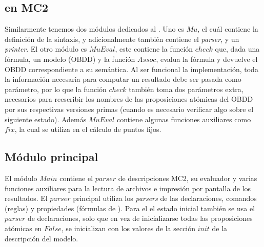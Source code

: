 \subsection{{\mucalculo} en MC2}

Similarmente tenemos dos módulos dedicados al {\mucalculo}. Uno es $Mu$, el cuál contiene la definición de la sintaxis, y adicionalmente también contiene el \textit{parser}, y un \textit{printer}. El otro módulo es $MuEval$, este contiene la función $check$ que, dada una fórmula, un modelo (OBDD) y la función $Assoc$, evalua la fórmula y devuelve el OBDD correspondiente a su semántica. Al ser funcional la implementación, toda la información necesaria para computar un resultado debe ser pasada como parámetro, por lo que la función $check$ también toma dos parámetros extra, necesarios para reescribir los nombres de las proposiciones atómicas del OBDD por sus respectivas versiones primas (cuando es necesario verificar algo sobre el siguiente estado). Además $MuEval$ contiene algunas funciones auxiliares como $fix$, la cual se utiliza en el cálculo de puntos fijos.

\subsection{Módulo principal}

El módulo $Main$ contiene el $parser$ de descripciones MC2, su evaluador y varias funciones auxiliares para la lectura de archivos e impresión por pantalla de los resultados. El $parser$ principal utiliza los \textit{parsers} de las declaraciones, comandos (reglas) y propiedades (fórmulas de {\mucalculo}). Para el el estado inicial también se usa el $parser$ de declaraciones, solo que en vez de inicializarse todas las proposiciones atómicas en $False$, se inicializan con los valores de la sección $init$ de la descripción del modelo.